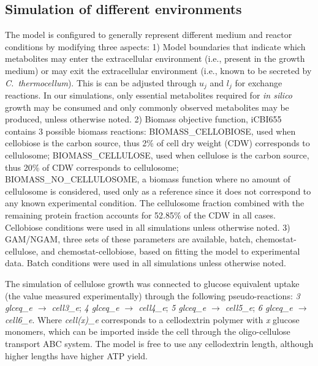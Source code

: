 \subsection{Simulation of different environments}
The model is configured to generally represent different medium and reactor conditions by modifying three aspects:
1) Model boundaries that indicate which metabolites may enter the extracellular environment (i.e., present in the growth medium) or may exit the extracellular environment (i.e., known to be secreted by \textit{C.~thermocellum}). This is can be adjusted through $u_j$ and $l_j$ for exchange reactions.
In our simulations, only essential metabolites required for \textit{in silico} growth may be consumed and only commonly observed metabolites may be
produced, unless otherwise noted.
2) Biomass objective function, iCBI655 contains 3 possible biomass reactions:
BIOMASS\_CELLOBIOSE, used when cellobiose is the carbon source, thus 2\% of cell dry weight (CDW) corresponds to cellulosome;\citep{zhang2005}
BIOMASS\_CELLULOSE, used when cellulose is the carbon source, thus 20\% of CDW corresponds to cellulosome; \citep{zhang2005}
BIOMASS\_NO\_CELLULOSOME, a biomass function where no amount of cellulosome is considered, used only as a reference since it does not correspond to any known experimental condition.
The cellulosome fraction combined with the remaining protein fraction accounts for 52.85\% of the CDW in all cases. \citep{roberts2010, thompson2015}
Cellobiose conditions were used in all simulations unless otherwise noted.
3) GAM/NGAM, three sets of these parameters are available, batch, chemostat-cellulose, and chemostat-cellobiose, based on fitting the model to experimental data.
Batch conditions were used in all simulations unless otherwise noted.

The simulation of cellulose growth was connected to glucose equivalent
uptake (the value measured experimentally) through the following
pseudo-reactions:
\textit{3 glceq\_e $\rightarrow$ cell3\_e}; \textit{4 glceq\_e $\rightarrow$ cell4\_e};
\textit{5 glceq\_e $\rightarrow$ cell5\_e}; \textit{6 glceq\_e $\rightarrow$ cell6\_e}.
Where \textit{cell(x)\_e} corresponds to a cellodextrin polymer with \textit{x} glucose monomers, which can be imported inside the cell through the oligo-cellulose transport ABC system. The model is free to use any cellodextrin length, although higher lengths have higher ATP yield. \citep{zhang2005, thompson2016}

